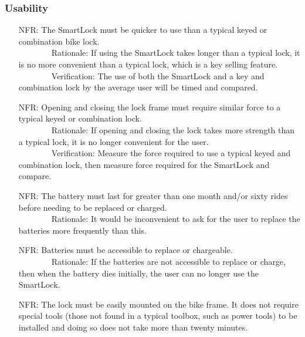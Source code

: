 \documentclass[12pt]{article}
\newcounter{nfrnum} %
\begin{document}
\subsubsection{Usability}
\begin{itemize}
\setlength{\itemindent}{.5in}
\item[NFR\refstepcounter{nfrnum}\thenfrnum\label{NFRCompQuick}:]  The SmartLock must be quicker to use than a typical keyed or combination bike lock.
\\ \-\ \-\ \-\ \-\ \-\ \-\ \-\ \-\ Rationale: If using the SmartLock takes longer than a typical lock, it is no more convenient than a typical lock, which is a key selling feature. 
\\ \-\ \-\ \-\ \-\ \-\ \-\ \-\ \-\ Verification: The use of both the SmartLock and a key and combination lock by the average user will be timed and compared. 
\item[NFR\refstepcounter{nfrnum}\thenfrnum\label{NFRCompForce}:] Opening and closing the lock frame must require similar force to a typical keyed or combination lock.
\\ \-\ \-\ \-\ \-\ \-\ \-\ \-\ \-\ Rationale: If opening and closing the lock takes more strength than a typical lock, it is no longer convenient for the user. 
\\ \-\ \-\ \-\ \-\ \-\ \-\ \-\ \-\ Verification: Measure the force required to use a typical keyed and combination lock, then measure force required for the SmartLock and compare.
\item[NFR\refstepcounter{nfrnum}\thenfrnum\label{NFRBatteryLife}:] The battery must last for greater than one month and/or sixty rides before needing to be replaced or charged.
\\ \-\ \-\ \-\ \-\ \-\ \-\ \-\ \-\ Rationale: It would be inconvenient to ask for the user to replace the batteries more frequently than this.
\item[NFR\refstepcounter{nfrnum}\thenfrnum\label{NFRBatteryAccess}:] Batteries must be accessible to replace or chargeable.
\\ \-\ \-\ \-\ \-\ \-\ \-\ \-\ \-\ Rationale: If the batteries are not accessible to replace or charge, then when the battery dies initially, the user can no longer use the SmartLock.
\item[NFR\refstepcounter{nfrnum}\thenfrnum\label{NFRTools}:] The lock must be easily mounted on the bike frame. It does not require special tools (those not found in a typical toolbox, such as power tools) to be installed and doing so does not take more than twenty minutes. 

\end{itemize}
\end{document}

